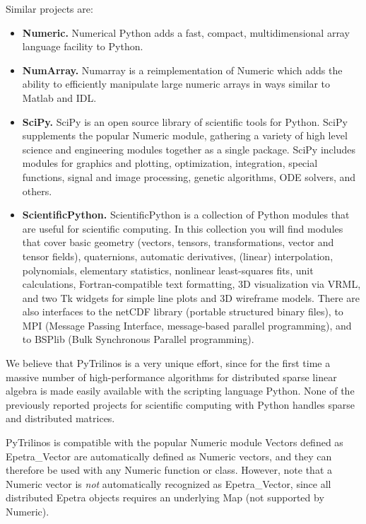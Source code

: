 \documentclass[10pt,relax]{SANDreport}
\begin{document}
Similar projects are:
\begin{itemize}
\item {\bf Numeric.} Numerical Python adds a fast, compact, multidimensional array language facility to Python.
\item  {\bf NumArray.} 
Numarray is a reimplementation of Numeric which adds the ability to
efficiently manipulate large numeric arrays in ways similar to Matlab and IDL.
\item {\bf SciPy.} SciPy is an open source library of scientific tools for
Python. SciPy supplements the popular Numeric module, gathering a variety of
high level science and engineering modules together as a single package. SciPy
includes modules for graphics and plotting, optimization, integration, special
functions, signal and image processing, genetic algorithms, ODE solvers, and
others.
\item {\bf ScientificPython.} 
ScientificPython is a collection of Python modules that are useful for
scientific computing. In this collection you will find modules that cover
basic geometry (vectors, tensors, transformations, vector and tensor fields),
  quaternions, automatic derivatives, (linear) interpolation, polynomials,
  elementary statistics, nonlinear least-squares fits, unit calculations,
  Fortran-compatible text formatting, 3D visualization via VRML, and two Tk
  widgets for simple line plots and 3D wireframe models. There are also
  interfaces to the netCDF library (portable structured binary files), to MPI
  (Message Passing Interface, message-based parallel programming), and to
  BSPlib (Bulk Synchronous Parallel programming).
\end{itemize}
We believe that PyTrilinos is a very unique effort, since for the first time a
massive number of high-performance algorithms for distributed sparse linear
algebra is made easily available with the scripting language Python.  None of
the previously reported projects for scientific computing with Python handles
sparse and distributed matrices. 

\smallskip

PyTrilinos is compatible with the popular Numeric module
Vectors defined as Epetra\_Vector are automatically defined as Numeric
vectors, and they can therefore be used with any Numeric function or class.
However, note that a Numeric vector is {\sl not} automatically recognized as
Epetra\_Vector, since all distributed Epetra objects requires an underlying
Map (not supported by Numeric).

\bigskip
{}
\bigskip
\end{document}
